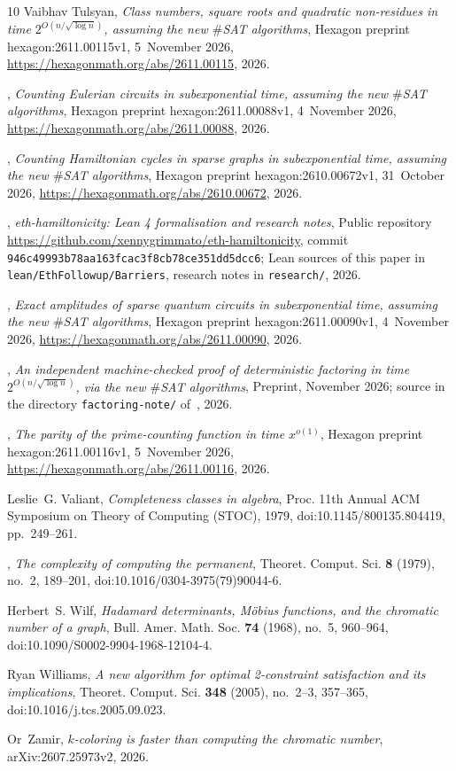 \documentclass[10pt]{amsart}
\theoremstyle{plain}
\theoremstyle{definition}
\theoremstyle{remark}
\numberwithin{equation}{section}
\begin{document}
\begin{thebibliography}{10}
Vaibhav Tulsyan, \emph{Class numbers, square roots and quadratic non-residues
  in time $2^{O(n/\sqrt{\log n})}$, assuming the new $\#${SAT} algorithms},
  Hexagon preprint hexagon:2611.00115v1, 5~November 2026,
  \url{https://hexagonmath.org/abs/2611.00115}, 2026.

\bysame, \emph{Counting {E}ulerian circuits in subexponential time, assuming
  the new $\#${SAT} algorithms}, Hexagon preprint hexagon:2611.00088v1,
  4~November 2026, \url{https://hexagonmath.org/abs/2611.00088}, 2026.

\bysame, \emph{Counting {H}amiltonian cycles in sparse graphs in subexponential
  time, assuming the new $\#${SAT} algorithms}, Hexagon preprint
  hexagon:2610.00672v1, 31~October 2026,
  \url{https://hexagonmath.org/abs/2610.00672}, 2026.

\bysame, \emph{eth-hamiltonicity: {L}ean 4 formalisation and research notes},
  Public repository \url{https://github.com/xennygrimmato/eth-hamiltonicity},
  commit \texttt{946c49993b78aa163fcac3f8cb78ce351dd5dcc6}; Lean sources of this paper in
  \texttt{lean/EthFollowup/Barriers}, research notes in \texttt{research/},
  2026.

\bysame, \emph{Exact amplitudes of sparse quantum circuits in subexponential
  time, assuming the new $\#${SAT} algorithms}, Hexagon preprint
  hexagon:2611.00090v1, 4~November 2026,
  \url{https://hexagonmath.org/abs/2611.00090}, 2026.

\bysame, \emph{An independent machine-checked proof of deterministic factoring
  in time $2^{O(n/\sqrt{\log n})}$, via the new $\#${SAT} algorithms},
  Preprint, November 2026; source in the directory \texttt{factoring-note/}
  of~\cite{TulsyanRepo26}, 2026.

\bysame, \emph{The parity of the prime-counting function in time $x^{o(1)}$},
  Hexagon preprint hexagon:2611.00116v1, 5~November 2026,
  \url{https://hexagonmath.org/abs/2611.00116}, 2026.

Leslie~G. Valiant, \emph{Completeness classes in algebra}, Proc. 11th Annual
  ACM Symposium on Theory of Computing (STOC), 1979, doi:10.1145/800135.804419,
  pp.~249--261.

\bysame, \emph{The complexity of computing the permanent}, Theoret. Comput.
  Sci. \textbf{8} (1979), no.~2, 189--201, doi:10.1016/0304-3975(79)90044-6.

Herbert~S. Wilf, \emph{Hadamard determinants, {M}{\"o}bius functions, and the
  chromatic number of a graph}, Bull. Amer. Math. Soc. \textbf{74} (1968),
  no.~5, 960--964, doi:10.1090/S0002-9904-1968-12104-4.

Ryan Williams, \emph{A new algorithm for optimal 2-constraint satisfaction and
  its implications}, Theoret. Comput. Sci. \textbf{348} (2005), no.~2--3,
  357--365, doi:10.1016/j.tcs.2005.09.023.

Or~Zamir, \emph{$k$-coloring is faster than computing the chromatic number},
  arXiv:2607.25973v2, 2026.

\end{thebibliography}
\end{document}

